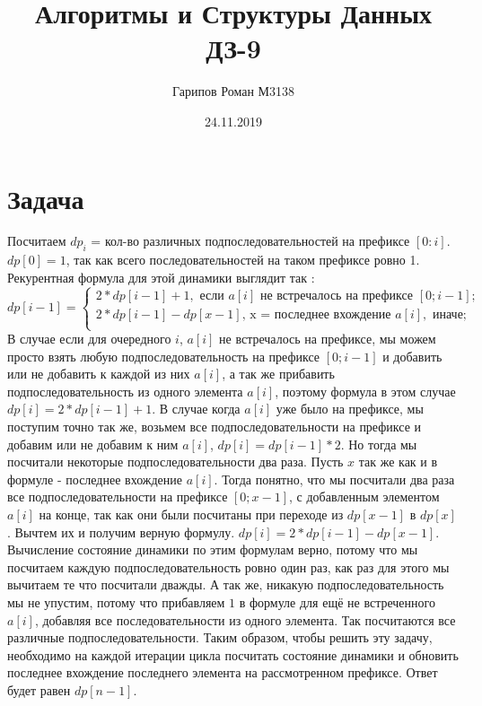 \documentclass{article}
\title{Алгоритмы и Структуры Данных ДЗ-9}
\date{24.11.2019}
\author{Гарипов Роман М3138}
\begin{document}
  \maketitle
  \newpage

\section*{Задача }
Посчитаем $dp_{i}$ = кол-во различных подпоследовательностей на префиксе $[0:i]$. $dp[0] = 1$, так как всего последовательностей на таком префиксе ровно 1. Рекурентная формула для этой динамики выглядит так : 
$$
dp[i - 1]=\begin{cases}
2 * dp[i - 1] + 1,\text{  если $a[i]$ не встречалось на префиксе $[0;i - 1]$;}\\
2 * dp[i - 1] - dp[x - 1] \mbox{, x = последнее вхождение $a[i]$}, \text{  иначе;}\\
\end{cases}
$$
В случае если для очередного $i$, $a[i]$ не встречалось на префиксе, мы можем просто взять любую подпоследовательность на префиксе $[0;i - 1]$ и добавить или не добавить к каждой из них $a[i]$, а так же прибавить подпоследовательность из одного элемента ${a[i]}$, поэтому формула в этом случае $dp[i] = 2 * dp[i - 1] + 1$.
\newline
В случае когда $a[i]$ уже было на префиксе, мы поступим точно так же, возьмем все подпоследовательности на префиксе и добавим или не добавим к ним $a[i]$, $dp[i] = dp[i - 1] * 2$. Но тогда мы посчитали некоторые подпоследовательности два раза. Пусть $x$ так же как и в формуле - последнее вхождение $a[i]$. Тогда понятно, что мы посчитали два раза все подпоследовательности на префиксе $[0;x - 1]$, с добавленным элементом $a[i]$ на конце, так как они были посчитаны при переходе из $dp[x - 1]$ в $dp[x]$. Вычтем их и получим верную формулу. $dp[i] = 2 * dp[i - 1] - dp[x - 1]$.
\newline
Вычисление состояние динамики по этим формулам верно, потому что мы посчитаем каждую подпоследовательность ровно один раз, как раз для этого мы вычитаем те что посчитали дважды. А так же, никакую подпоследовательность мы не упустим, потому что прибавляем $1$ в формуле для ещё не встреченного $a[i]$, добавляя все последовательности из одного элемента. Так посчитаются все различные подпоследовательности.
\newline
Таким образом, чтобы решить эту задачу, необходимо на каждой итерации цикла посчитать состояние динамики и обновить последнее вхождение последнего элемента на рассмотренном префиксе.
\newline
Ответ будет равен $dp[n - 1]$.
\end{document}
